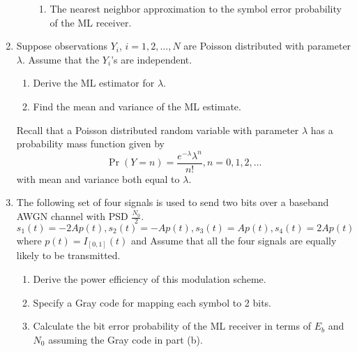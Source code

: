 \documentclass[10pt]{report}
\begin{document}
\begin{enumerate}
\begin{enumerate}
\begin{enumerate}
          \item The nearest neighbor approximation to the symbol error probability of the ML receiver.
        \end{enumerate}
    \end{enumerate}
  \item Suppose observations $Y_i$, $i=1,2,\ldots,N$ are Poisson distributed with parameter $\lambda$. Assume that the $Y_i$'s are independent.
    \begin{enumerate}
      \item Derive the ML estimator for $\lambda$.
      \item Find the mean and variance of the ML estimate.
    \end{enumerate}
  Recall that a Poisson distributed random variable with parameter $\lambda$ has a probability mass function given by
    \begin{equation*}
      \Pr(Y = n) = \frac{e^{-\lambda}\lambda^n}{n!}, n = 0,1,2,\ldots
    \end{equation*}
  with mean and variance both equal to $\lambda$.
  \item The following set of four signals is used to send two bits over a baseband AWGN channel with PSD $\frac{N_0}{2}$. 
    \begin{equation*}
      s_1(t) = -2A p(t), s_2(t) = -A p(t), s_3(t) = A p(t), s_4(t) = 2A p(t)
    \end{equation*}
    where $p(t) = I_{[0,1]}(t)$ and 
    Assume that all the four signals are equally likely to be transmitted.
    \begin{enumerate}
      \item Derive the power efficiency of this modulation scheme.
      \item Specify a Gray code for mapping each symbol to 2 bits.
      \item Calculate the bit error probability of the ML receiver in terms of $E_b$ and $N_0$ assuming the Gray code in part (b).
    \end{enumerate}
\end{enumerate}
\end{document}
